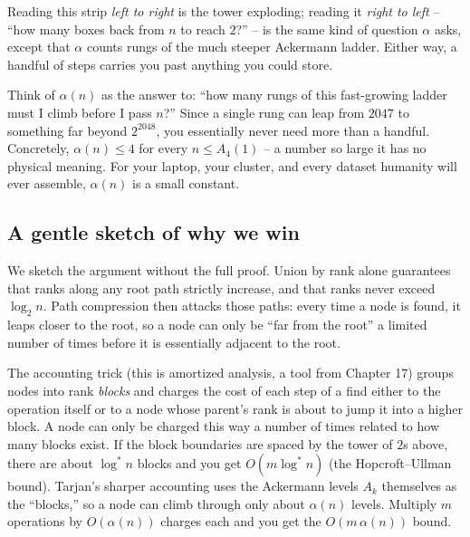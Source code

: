 \begin{center}
\end{center}

Reading this strip \emph{left to right} is the tower exploding; reading it
\emph{right to left} -- ``how many boxes back from $n$ to reach $2$?'' -- is the
same kind of question $\alpha$ asks, except that $\alpha$ counts rungs of the
much steeper Ackermann ladder. Either way, a handful of steps carries you past
anything you could store.

\begin{intuitionbox}
Think of $\alpha(n)$ as the answer to: ``how many rungs of this fast-growing
ladder must I climb before I pass $n$?'' Since a single rung can leap from
$2047$ to something far beyond $2^{2048}$, you essentially never need more than
a handful. Concretely, $\alpha(n) \le 4$ for every $n \le A_4(1)$ -- a number so
large it has no physical meaning. For your laptop, your cluster, and every
dataset humanity will ever assemble, $\alpha(n)$ is a small constant.
\end{intuitionbox}

\subsection{A gentle sketch of why we win}
\label{ch19:sketch}

We sketch the argument without the full proof. Union by rank
alone guarantees that ranks along any root path strictly increase, and that
ranks never exceed $\log_2 n$. Path compression then attacks those paths: every
time a node is found, it leaps closer to the root, so a node can only be ``far
from the root'' a limited number of times before it is essentially adjacent to
the root.

The accounting trick (this is amortized analysis, a tool from Chapter 17)
groups nodes into rank \emph{blocks} and charges the cost of each step of a
find either to the operation itself or to a node whose parent's rank is about to
jump it into a higher block. A node can only be charged this way a number of
times related to how many blocks exist. If the block boundaries are spaced by the
tower of $2$s above, there are about $\log^* n$ blocks and you get
$O(m \log^* n)$ (the Hopcroft--Ullman bound). Tarjan's sharper accounting uses
the Ackermann levels $A_k$ themselves as the ``blocks,'' so a node can climb
through only about $\alpha(n)$ levels. Multiply $m$ operations by $O(\alpha(n))$
charges each and you get the $O(m\,\alpha(n))$ bound.

